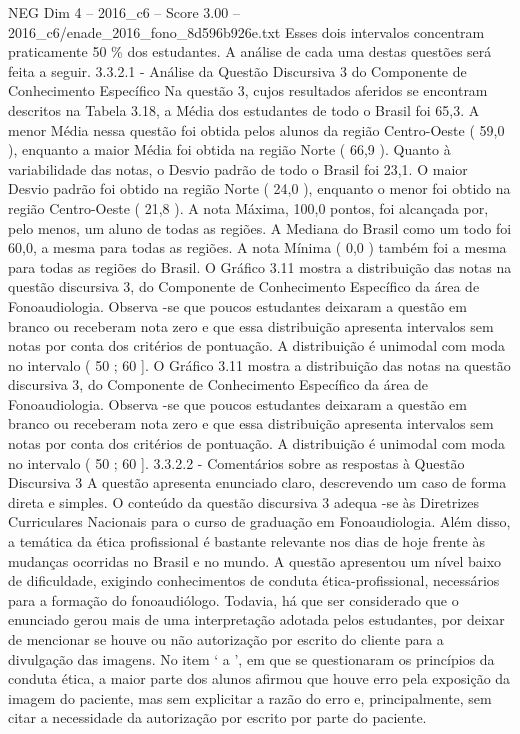 \begin{textsample}{NEG Dim 4 – 2016\_c6 – Score 3.00 – 2016\_c6/enade\_2016\_fono\_8d596b926e.txt}
Esses dois intervalos concentram praticamente 50 \% dos estudantes.
A análise de cada uma destas questões será feita a seguir. 3.3.2.1 - Análise da Questão Discursiva 3 do Componente de Conhecimento Específico Na questão 3, cujos resultados aferidos se encontram descritos na Tabela 3.18, a Média dos estudantes de todo o Brasil foi 65,3.
A menor Média nessa questão foi obtida pelos alunos da região Centro-Oeste ( 59,0 ), enquanto a maior Média foi obtida na região Norte ( 66,9 ).
Quanto à variabilidade das notas, o Desvio padrão de todo o Brasil foi 23,1.
O maior Desvio padrão foi obtido na região Norte ( 24,0 ), enquanto o menor foi obtido na região Centro-Oeste ( 21,8 ).
A nota Máxima, 100,0 pontos, foi alcançada por, pelo menos, um aluno de todas as regiões.
A Mediana do Brasil como um todo foi 60,0, a mesma para todas as regiões.
A nota Mínima ( 0,0 ) também foi a mesma para todas as regiões do Brasil.
O Gráfico 3.11 mostra a distribuição das notas na questão discursiva 3, do Componente de Conhecimento Específico da área de Fonoaudiologia.
Observa -se que poucos estudantes deixaram a questão em branco ou receberam nota zero e que essa distribuição apresenta intervalos sem notas por conta dos critérios de pontuação.
A distribuição é unimodal com moda no intervalo ( 50 ; 60 ].
O Gráfico 3.11 mostra a distribuição das notas na questão discursiva 3, do Componente de Conhecimento Específico da área de Fonoaudiologia.
Observa -se que poucos estudantes deixaram a questão em branco ou receberam nota zero e que essa distribuição apresenta intervalos sem notas por conta dos critérios de pontuação.
A distribuição é unimodal com moda no intervalo ( 50 ; 60 ]. 3.3.2.2 - Comentários sobre as respostas à Questão Discursiva 3 A questão apresenta enunciado claro, descrevendo um caso de forma direta e simples.
O conteúdo da questão discursiva 3 adequa -se às Diretrizes Curriculares Nacionais para o curso de graduação em Fonoaudiologia.
Além disso, a temática da ética profissional é bastante relevante nos dias de hoje frente às mudanças ocorridas no Brasil e no mundo.
A questão apresentou um nível baixo de dificuldade, exigindo conhecimentos de conduta ética-profissional, necessários para a formação do fonoaudiólogo.
Todavia, há que ser considerado que o enunciado gerou mais de uma interpretação adotada pelos estudantes, por deixar de mencionar se houve ou não autorização por escrito do cliente para a divulgação das imagens.
No item ‘ a ’, em que se questionaram os princípios da conduta ética, a maior parte dos alunos afirmou que houve erro pela exposição da imagem do paciente, mas sem explicitar a razão do erro e, principalmente, sem citar a necessidade da autorização por escrito por parte do paciente.

\end{textsample}
